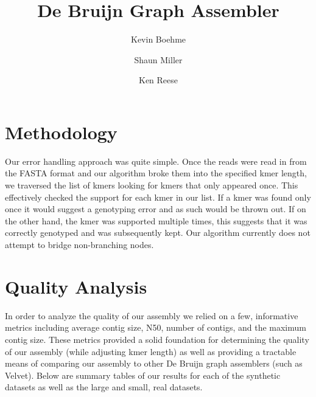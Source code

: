 \documentclass[12pt]{article}
\title{De Bruijn Graph Assembler}
\author{Kevin Boehme \and Shaun Miller \and Ken Reese}
\begin{document}
\maketitle

\section{Methodology}
Our error handling approach was quite simple. Once the reads were read in from the FASTA format and our algorithm broke them into the specified kmer length, we traversed the list of kmers looking for kmers that only appeared once. This effectively checked the support for each kmer in our list. If a kmer was found only once it would suggest a genotyping error and as such would be thrown out. If on the other hand, the kmer was supported multiple times, this suggests that it was correctly genotyped and was subsequently kept.  Our algorithm currently does not attempt to bridge non-branching nodes.

\section{Quality Analysis}
In order to analyze the quality of our assembly we relied on a few, informative metrics including average contig size, N50, number of contigs, and the maximum contig size. These metrics provided a solid foundation for determining the quality of our assembly (while adjusting kmer length) as well as providing a tractable means of comparing our assembly to other De Bruijn graph assemblers (such as Velvet).
Below are summary tables of our results for each of the synthetic datasets as well as the large and small, real datasets.
\end{document}
